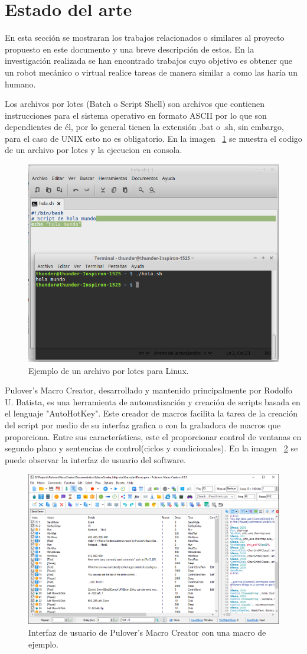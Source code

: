 
\section{Estado del arte}
En esta sección se mostraran los trabajos relacionados o similares al proyecto
 propuesto en este documento y una breve descripción de estos. En la
 investigación realizada se han encontrado trabajos cuyo objetivo es obtener
 que un robot mecánico o virtual realice tareas de manera similar a como las
 haría un humano. 


Los archivos por lotes (Batch o Script Shell) \cite{Silberschatz1999} son
 archivos que contienen instrucciones para el sistema operativo en formato
 ASCII por lo que son dependientes de él, por lo general tienen la extensión
 .bat o .sh, sin embargo, para el caso de UNIX esto no es obligatorio. En la
 imagen ~\ref{fig:script} se muestra el codigo de un archivo por lotes y la 
 ejecucion en consola.


\begin{figure}[H]
\centering
\includegraphics[width=0.5\columnwidth]{CapituloI/Imagenes/Script.png}
\caption{Ejemplo de un archivo por lotes para Linux.}
\label{fig:script}
\end{figure}


Pulover's Macro Creator\cite{Batista}, desarrollado y mantenido principalmente
 por Rodolfo U. Batista, es una herramienta de automatización y creación de
 scripts basada en el lenguaje "AutoHotKey". Este  creador de macros facilita
 la tarea de la creación del script por medio de  su interfaz grafica o con la
 grabadora de macros que proporciona. Entre sus características, este el
 proporcionar  control de ventanas en segundo plano y sentencias de
 control(ciclos y condicionales). En la imagen ~\ref{fig:macros} se puede observar la interfaz de usuario del software.


\begin{figure}[H]
\centering
\includegraphics[width=0.5\columnwidth]{CapituloI/Imagenes/Macros.png}
\caption{Interfaz de usuario de Pulover's Macro Creator con una macro de
 ejemplo.}
\label{fig:macros}
\end{figure}



